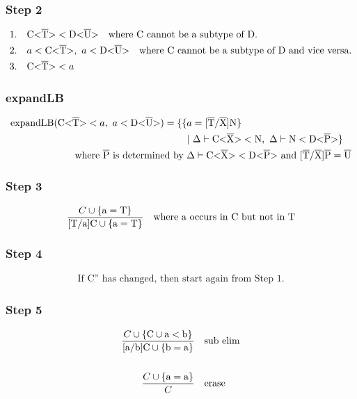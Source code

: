 \documentclass[aspectratio=169]{beamer}
\begin{document}
\begin{frame}[fragile]
    \frametitle{Step 2}
    \begin{align*}
        1.& \quad \text{C<}\overline{\text{T}}\text{>} < \text{D<}\overline{\text{U}}\text{>} \quad \text{where C cannot be a subtype of D.}\\
        2.& \quad a < \text{C<}\overline{\text{T}}\text{>}, \ a < \text{D<}\overline{\text{U}}\text{>} \quad \text{where C cannot be a subtype of D and vice versa.}\\
        3.& \quad \text{C<}\overline{\text{T}}\text{>} < a
    \end{align*}
\end{frame}

\begin{frame}[fragile]
    \frametitle{expandLB}
    \begin{align*}
        \text{expandLB} ( \text{C<}\overline{\text{T}}\text{>} < a, \ a < \text{D<}\overline{\text{U}}\text{>} ) = \{ \{ &a = \text{[}\overline{\text{T}}/\overline{\text{X}}\text{]N} \} \\
         &| \ \Delta \vdash \text{C<}\overline{\text{X}}\text{>} < \text{N}, \ \Delta \vdash \text{N} < \text{D<}\overline{\text{P}}\text{>} \}\\
        \text{where} \ \overline{\text{P}} \ \text{is determined by } & \Delta \vdash \text{C<}\overline{\text{X}}\text{>} < \text{D<}\overline{\text{P}}\text{>} \ \text{and} \ \text{[}\overline{\text{T}}/\overline{\text{X}}\text{]}\overline{\text{P}} = \overline{\text{U}}\\
    \end{align*}
\end{frame}

\begin{frame}[fragile]
    \frametitle{Step 3}
    \begin{align*}
        \frac{C \cup \{ \text{a} = \text{T} \}}{ \text{[T/a]C} \cup \{ \text{a} = \text{T} \} } \quad \text{where a occurs in C but not in T}
    \end{align*}
\end{frame}

\begin{frame}[fragile]
    \frametitle{Step 4}
    \begin{align*}
        \text{If C'' has changed, then start again from Step 1.} 
    \end{align*}
\end{frame}

\begin{frame}[fragile]
    \frametitle{Step 5}
    \begin{align*}
        \frac{C \cup \{ \text{C} \cup \text{a} < \text{b} \}}{ \text{[a/b]C} \cup \{ \text{b} = \text{a} \} } \quad &\text{sub elim}
        \\
        \\
        \frac{C \cup \{ \text{a} = \text{a} \} }{ C } \quad &\text{erase}
    \end{align*}
\end{frame}
\end{document}

